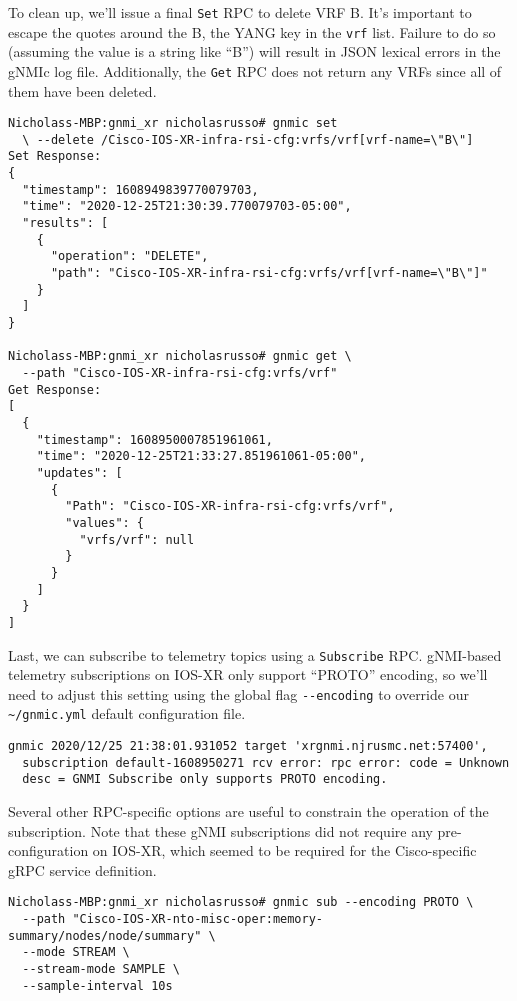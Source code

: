 To clean up, we'll issue a final \verb|Set| RPC to delete VRF B\@. It's
important to escape the quotes around the B, the YANG key in the \verb|vrf|
list. Failure to do so (assuming the value is a string like ``B'') will result
in JSON lexical errors in the gNMIc log file. Additionally, the \verb|Get| RPC
does not return any VRFs since all of them have been deleted.

\begin{verbatim}
Nicholass-MBP:gnmi_xr nicholasrusso# gnmic set
  \ --delete /Cisco-IOS-XR-infra-rsi-cfg:vrfs/vrf[vrf-name=\"B\"]
Set Response:
{
  "timestamp": 1608949839770079703,
  "time": "2020-12-25T21:30:39.770079703-05:00",
  "results": [
    {
      "operation": "DELETE",
      "path": "Cisco-IOS-XR-infra-rsi-cfg:vrfs/vrf[vrf-name=\"B\"]"
    }
  ]
}

Nicholass-MBP:gnmi_xr nicholasrusso# gnmic get \
  --path "Cisco-IOS-XR-infra-rsi-cfg:vrfs/vrf"
Get Response:
[
  {
    "timestamp": 1608950007851961061,
    "time": "2020-12-25T21:33:27.851961061-05:00",
    "updates": [
      {
        "Path": "Cisco-IOS-XR-infra-rsi-cfg:vrfs/vrf",
        "values": {
          "vrfs/vrf": null
        }
      }
    ]
  }
]
\end{verbatim}

Last, we can subscribe to telemetry topics using a \verb|Subscribe|
RPC\@. gNMI-based telemetry subscriptions on IOS-XR only support ``PROTO''
encoding, so we'll need to adjust this setting using the global flag
\verb|--encoding| to override our \verb|~/gnmic.yml| default configuration
file.

\begin{verbatim}
gnmic 2020/12/25 21:38:01.931052 target 'xrgnmi.njrusmc.net:57400',
  subscription default-1608950271 rcv error: rpc error: code = Unknown
  desc = GNMI Subscribe only supports PROTO encoding.
\end{verbatim}

Several other RPC-specific options are useful to constrain the
operation of the subscription. Note that these gNMI subscriptions did not
require any pre-configuration on IOS-XR, which seemed to be required for
the Cisco-specific gRPC service definition.

\begin{verbatim}
Nicholass-MBP:gnmi_xr nicholasrusso# gnmic sub --encoding PROTO \
  --path "Cisco-IOS-XR-nto-misc-oper:memory-summary/nodes/node/summary" \
  --mode STREAM \
  --stream-mode SAMPLE \
  --sample-interval 10s
\end{verbatim}

